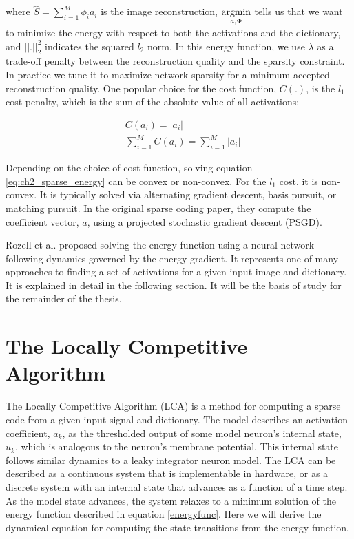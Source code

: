 where $\hat{S} = \sum\limits_{i=1}^{M}\phi_{i}a_{i}$ is the image reconstruction, $\argmin\limits_{a, \Phi}$ tells us that we want to minimize the energy with respect to both the activations and the dictionary, and $||.||_2^2$ indicates the squared $l_2$ norm. In this energy function, we use $\lambda$ as a trade-off penalty between the reconstruction quality and the sparsity constraint. In practice we tune it to maximize network sparsity for a minimum accepted reconstruction quality. One popular choice for the cost function, $C(.)$, is the $l_1$ cost penalty, which is the sum of the absolute value of all activations:

\begin{align}\label{l1cost}
  &C(a_{i}) = |a_{i}| \\
  &\sum\limits_{i=1}^{M}C(a_{i}) = \sum\limits_{i=1}^{M}|a_{i}|
\end{align}

Depending on the choice of cost function, solving equation \ref{eq:ch2_sparse_energy} can be convex or non-convex. For the $l_{1}$ cost, it is non-convex. It is typically solved via alternating gradient descent, basis pursuit, or matching pursuit.
In the original sparse coding paper, they compute the coefficient vector, $a$, using a projected stochastic gradient descent (PSGD).

Rozell et al. \citeyearpar{rozell2008sparse} proposed solving the energy function using a neural network following dynamics governed by the energy gradient. It represents one of many approaches to finding a set of activations for a given input image and dictionary. It is explained in detail in the following section. It will be the basis of study for the remainder of the thesis.


\section{The Locally Competitive Algorithm}
The Locally Competitive Algorithm (LCA) is a method for computing a sparse code from a given input signal and dictionary. The model describes an activation coefficient, $a_{k}$, as the thresholded output of some model neuron's internal state, $u_{k}$, which is analogous to the neuron's membrane potential. This internal state follows similar dynamics to a leaky integrator neuron model. The LCA can be described as a continuous system that is implementable in hardware, or as a discrete system with an internal state that advances as a function of a time step. As the model state advances, the system relaxes to a minimum solution of the energy function described in equation \eqref{energyfunc}. Here we will derive the dynamical equation for computing the state transitions from the energy function.

